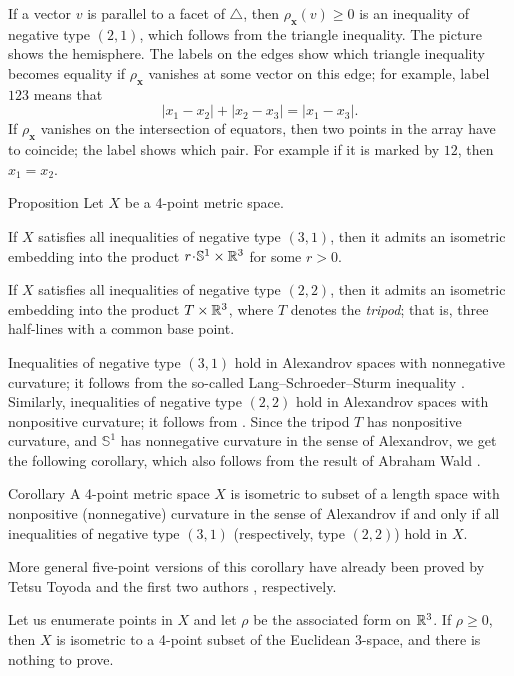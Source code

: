 \documentclass[a4paper,10pt]{article}
\begin{document}
If a vector $v$ is parallel to a facet of $\triangle$, then $\rho_{\bm{x}}(v)\ge 0$ is an inequality of negative type $(2,1)$, which follows from the triangle inequality.
The picture shows the hemisphere.
The labels on the edges show which triangle inequality becomes equality if $\rho_{\bm{x}}$ vanishes at some vector on this edge;
for example, label $123$ means that
\[|x_1-x_2|+|x_2-x_3|=|x_1-x_3|.\]
If $\rho_{\bm{x}}$ vanishes on the intersection of equators, then two points in the array have to coincide;
the label shows which pair.
For example if it is marked by $12$, then $x_1=x_2$.

\begin{thm}{Proposition}\label{prop:Four-point arrays}
Let $X$ be a 4-point metric space.

If $X$ satisfies all inequalities of negative type $(3, 1)$, then it admits an isometric embedding into the product $r\cdot \mathbb{S}^1\times\RR^3$ for some $r>0$.

If $X$ satisfies all inequalities of negative type $(2, 2)$, then it admits an isometric embedding into the product $T\times\mathbb{R}^3$, where $T$ denotes the \emph{tripod};
that is, three half-lines with a common base point.
\end{thm}

Inequalities of negative type $(3, 1)$ hold in Alexandrov spaces with nonnegative curvature; it follows from the so-called Lang--Schroeder--Sturm inequality \cite{lang-schroeder, sturm}.
Similarly, inequalities of negative type $(2, 2)$ hold in Alexandrov spaces with nonpositive curvature; it follows from \cite[9.5]{AKP-2024}.
Since the tripod $T$ has nonpositive curvature, and $\mathbb{S}^1$ has nonnegative curvature in the sense of Alexandrov, we get the following corollary, which also follows from the result of Abraham Wald \cite[§ 7]{wald}.

\begin{thm}{Corollary}\label{cor:Four-point arrays}
A 4-point metric space $X$ is isometric to subset of a length space with nonpositive (nonnegative) curvature in the sense of Alexandrov if and only if all inequalities of negative type $(3, 1)$ (respectively, type $(2, 2)$) hold in $X$.
\end{thm}

More general five-point versions of this corollary have already been proved by Tetsu Toyoda \cite{toyoda,lebedeva-petrunin2021} and the first two authors \cite{lebedeva-petrunin-2024}, respectively.


Let us enumerate points in $X$ and let $\rho$ be the associated form on $\mathbb{R}^3$.
If $\rho\ge 0$, then $X$ is isometric to a 4-point subset of the Euclidean 3-space,
and there is nothing to prove.
\end{document}
